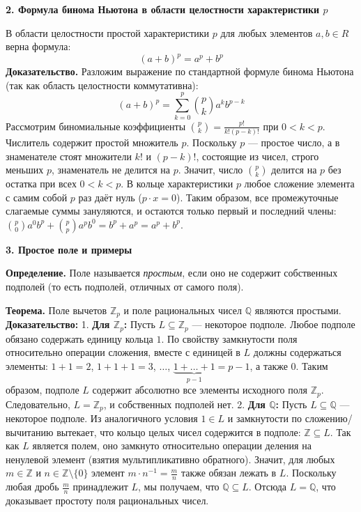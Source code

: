 \documentclass[12pt, a4paper]{article}
\theoremstyle{definition}
\theoremstyle{remark}
\begin{document}
\textbf{2. Формула бинома Ньютона в области целостности характеристики $p$}

В области целостности простой характеристики $p$ для любых элементов $a, b \in R$ верна формула:
$$ (a + b)^p = a^p + b^p $$
\textbf{Доказательство.} Разложим выражение по стандартной формуле бинома Ньютона (так как область целостности коммутативна):
$$ (a + b)^p = \sum_{k=0}^{p} \binom{p}{k} a^k b^{p-k} $$
Рассмотрим биномиальные коэффициенты $\binom{p}{k} = \frac{p!}{k!(p-k)!}$ при $0 < k < p$. Числитель содержит простой множитель $p$. Поскольку $p$ — простое число, а в знаменателе стоят множители $k!$ и $(p-k)!$, состоящие из чисел, строго меньших $p$, знаменатель не делится на $p$. Значит, число $\binom{p}{k}$ делится на $p$ без остатка при всех $0 < k < p$.
В кольце характеристики $p$ любое сложение элемента с самим собой $p$ раз даёт нуль ($p \cdot x = 0$). Таким образом, все промежуточные слагаемые суммы зануляются, и остаются только первый и последний члены: $\binom{p}{0}a^0 b^p + \binom{p}{p}a^p b^0 = b^p + a^p = a^p + b^p$.

\textbf{3. Простое поле и примеры}

\textbf{Определение.} Поле называется \textit{простым}, если оно не содержит собственных подполей (то есть подполей, отличных от самого поля).

\textbf{Теорема.} Поле вычетов $\mathbb{Z}_p$ и поле рациональных чисел $\mathbb{Q}$ являются простыми.
\textbf{Доказательство:}
1. \textbf{Для $\mathbb{Z}_p$:} Пусть $L \subseteq \mathbb{Z}_p$ — некоторое подполе. Любое подполе обязано содержать единицу кольца $1$. По свойству замкнутости поля относительно операции сложения, вместе с единицей в $L$ должны содержаться элементы: $1+1=2$, $1+1+1=3$, $\dots$, $\underbrace{1+\dots+1}_{p-1} = p-1$, а также $0$. Таким образом, подполе $L$ содержит абсолютно все элементы исходного поля $\mathbb{Z}_p$. Следовательно, $L = \mathbb{Z}_p$, и собственных подполей нет.
2. \textbf{Для $\mathbb{Q}$:} Пусть $L \subseteq \mathbb{Q}$ — некоторое подполе. Из аналогичного условия $1 \in L$ и замкнутости по сложению/вычитанию вытекает, что кольцо целых чисел содержится в подполе: $\mathbb{Z} \subseteq L$. Так как $L$ является полем, оно замкнуто относительно операции деления на ненулевой элемент (взятия мультипликативно обратного). Значит, для любых $m \in \mathbb{Z}$ и $n \in \mathbb{Z} \setminus \{0\}$ элемент $m \cdot n^{-1} = \frac{m}{n}$ также обязан лежать в $L$. Поскольку любая дробь $\frac{m}{n}$ принадлежит $L$, мы получаем, что $\mathbb{Q} \subseteq L$. Отсюда $L = \mathbb{Q}$, что доказывает простоту поля рациональных чисел.
\end{document}
